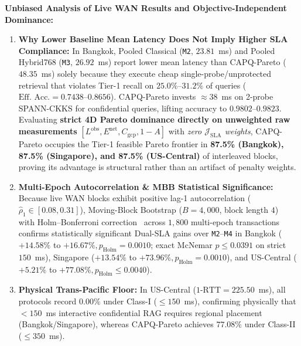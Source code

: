 \documentclass[10pt,journal,compsoc]{IEEEtran}
\begin{document}
\textbf{Unbiased Analysis of Live WAN Results and Objective-Independent Dominance:}
\begin{enumerate}
    \item \textbf{Why Lower Baseline Mean Latency Does Not Imply Higher SLA Compliance:} In Bangkok, Pooled Classical (\texttt{M2}, $23.81$~ms) and Pooled Hybrid768 (\texttt{M3}, $26.92$~ms) report lower mean latency than CAPQ-Pareto ($48.35$~ms) solely because they execute cheap single-probe/unprotected retrieval that violates Tier-1 recall on $25.0\%$--$31.2\%$ of queries ($\text{Eff. Acc.}=0.7438$--$0.8656$). CAPQ-Pareto invests $\approx 38$~ms on 2-probe SPANN-CKKS for confidential queries, lifting accuracy to $0.9802$--$0.9823$. Evaluating \textbf{strict 4D Pareto dominance directly on unweighted raw measurements} $[L^{\mathrm{obs}}, E^{\mathrm{net}}, C_{\mathrm{gcp}}, 1-A]$ with \emph{zero $\mathcal{J}_{\mathrm{SLA}}$ weights}, CAPQ-Pareto occupies the Tier-1 feasible Pareto frontier in \textbf{87.5\% (Bangkok), 87.5\% (Singapore), and 87.5\% (US-Central)} of interleaved blocks, proving its advantage is structural rather than an artifact of penalty weights.
    \item \textbf{Multi-Epoch Autocorrelation \& MBB Statistical Significance:} Because live WAN blocks exhibit positive lag-1 autocorrelation ($\hat{\rho}_1 \in [0.08, 0.31]$), Moving-Block Bootstrap ($B=4,000$, block length $4$)~\cite{kunsch1989blockboot} with Holm--Bonferroni correction~\cite{holm1979simple} across $1,800$ multi-epoch transactions confirms statistically significant Dual-SLA gains over \texttt{M2}--\texttt{M4} in Bangkok ($+14.58\%$ to $+16.67\%, p_{\mathrm{Holm}}=0.0010$; exact McNemar $p \le 0.0391$ on strict $150$~ms), Singapore ($+13.54\%$ to $+73.96\%, p_{\mathrm{Holm}}=0.0010$), and US-Central ($+5.21\%$ to $+77.08\%, p_{\mathrm{Holm}} \le 0.0040$).
    \item \textbf{Physical Trans-Pacific Floor:} In US-Central ($\text{1-RTT}=225.50$~ms), all protocols record $0.00\%$ under Class-I ($\le 150$~ms), confirming physically that $<150$~ms interactive confidential RAG requires regional placement (Bangkok/Singapore), whereas CAPQ-Pareto achieves $77.08\%$ under Class-II ($\le 350$~ms).
\end{enumerate}
\end{document}
